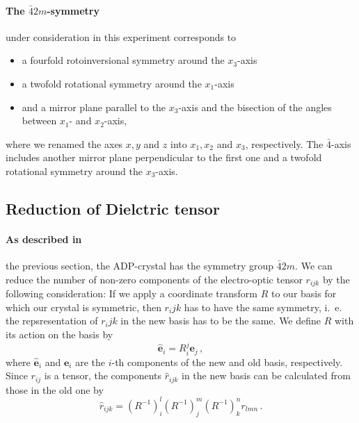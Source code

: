 \paragraph{The $\bar{4}2m$-symmetry}
under consideration in this experiment corresponds to 
\begin{itemize}
    \item
    a fourfold rotoinversional symmetry around the $x_3$-axis
    \item
    a twofold rotational symmetry around the $x_1$-axis
    \item
    and a mirror plane parallel to the $x_3$-axis and the bisection of the 
    angles between $x_1$- and $x_2$-axis, 
\end{itemize}
where we renamed the axes $x, y$ and $z$ into $x_1, x_2$ and $x_3$, respectively. 
The $\bar{4}$-axis includes another mirror 
plane perpendicular to the first one and a twofold rotational symmetry 
around the $x_3$-axis. 

\subsection{Reduction of Dielctric tensor}
\label{sec:reduce}
\paragraph{As described in} 
the previous section, the ADP-crystal has the symmetry group 
$\bar{4}2m$. We can reduce the number of non-zero components of the 
electro-optic tensor $r_{ijk}$ by the following consideration:
If we apply a coordinate transform $R$ to our basis for which 
our crystal is symmetric, then $r_ijk$ has to have the same symmetry, 
i.~e. the repsresentation of $r_ijk$ in the new basis has to be the same.
We define $R$ with its action on the basis by 
\begin{equation}
    \mathbf{\hat{e}}_i = R_i^j \mathbf{e}_j \, ,
\end{equation}
where $\mathbf{\hat{e}}_i$ and $\mathbf{e}_i$ are 
the $i$-th components of the new and old basis, respectively. 
Since $r_{ij}$ is a tensor, the components $\hat{r}_{ijk}$ in the 
new basis can be calculated from those in the old one by 
\begin{equation}
    \hat{r}_{ijk} = 
        \left( R^{-1}\right)_i^l
        \left( R^{-1}\right)_j^m
        \left( R^{-1}\right)_k^n
        r_{lmn} \, .
\end{equation}


